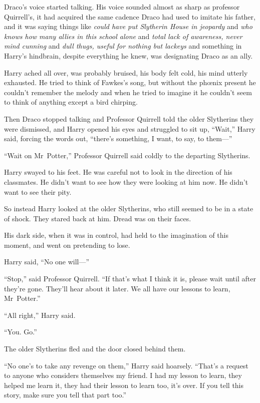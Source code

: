 Draco’s voice started talking. His voice sounded almost as sharp as professor Quirrell’s, it had acquired the same cadence Draco had used to imitate his father, and it was saying things like \emph{could have put Slytherin House in jeopardy} and \emph{who knows how many allies in this school alone} and \emph{total lack of awareness, never mind cunning} and \emph{dull thugs, useful for nothing but lackeys} and something in Harry’s hindbrain, despite everything he knew, was designating Draco as an ally.

Harry ached all over, was probably bruised, his body felt cold, his mind utterly exhausted. He tried to think of Fawkes’s song, but without the phœnix present he couldn’t remember the melody and when he tried to imagine it he couldn’t seem to think of anything except a bird chirping.

Then Draco stopped talking and Professor Quirrell told the older Slytherins they were dismissed, and Harry opened his eyes and struggled to sit up, “Wait,” Harry said, forcing the words out, “there’s something, I want, to say, to them—”

“Wait on Mr~Potter,” Professor Quirrell said coldly to the departing Slytherins.

Harry swayed to his feet. He was careful not to look in the direction of his classmates. He didn’t want to see how they were looking at him now. He didn’t want to see their pity.

So instead Harry looked at the older Slytherins, who still seemed to be in a state of shock. They stared back at him. Dread was on their faces.

His dark side, when it was in control, had held to the imagination of this moment, and went on pretending to lose.

Harry said, “No one will—”

“Stop,” said Professor Quirrell. “If that’s what I think it is, please wait until after they’re gone. They’ll hear about it later. We all have our lessons to learn, Mr~Potter.”

“All right,” Harry said.

“You. Go.”

The older Slytherins fled and the door closed behind them.

“No one’s to take any revenge on them,” Harry said hoarsely. “That’s a request to anyone who considers themselves my friend. I had my lesson to learn, they helped me learn it, they had their lesson to learn too, it’s over. If you tell this story, make sure you tell that part too.”

